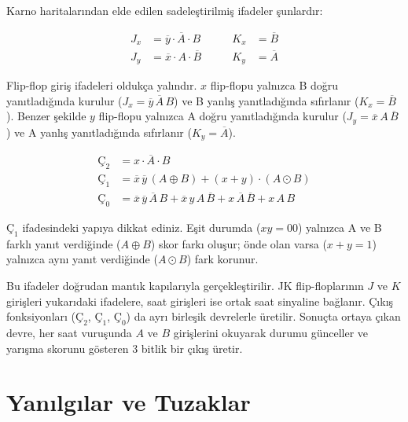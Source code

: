 \begin{ornek}[B.17]
Karno haritalarından elde edilen sadeleştirilmiş ifadeler şunlardır:

\[
\begin{aligned}
J_x &= \overline{y} \cdot \overline{A} \cdot B &\qquad K_x &= \overline{B} \\
J_y &= \overline{x} \cdot A \cdot \overline{B} &\qquad K_y &= \overline{A}
\end{aligned}
\]

Flip-flop giriş ifadeleri oldukça yalındır. $x$ flip-flopu yalnızca B doğru yanıtladığında kurulur ($J_x = \overline{y}\,\overline{A}\,B$) ve B yanlış yanıtladığında sıfırlanır ($K_x = \overline{B}$). Benzer şekilde $y$ flip-flopu yalnızca A doğru yanıtladığında kurulur ($J_y = \overline{x}\,A\,\overline{B}$) ve A yanlış yanıtladığında sıfırlanır ($K_y = \overline{A}$).

\[
\begin{aligned}
\text{Ç}_2 &= x \cdot \overline{A} \cdot B \\
\text{Ç}_1 &= \overline{x}\,\overline{y}\,(A \oplus B) + (x + y) \cdot (A \odot B) \\
\text{Ç}_0 &= \overline{x}\,\overline{y}\,\overline{A}\,B + \overline{x}\,y\,A\,\overline{B} + x\,\overline{A}\,\overline{B} + x\,A\,B
\end{aligned}
\]

$\text{Ç}_1$ ifadesindeki yapıya dikkat ediniz. Eşit durumda ($xy{=}00$) yalnızca A ve B farklı yanıt verdiğinde ($A \oplus B$) skor farkı oluşur; önde olan varsa ($x{+}y{=}1$) yalnızca aynı yanıt verdiğinde ($A \odot B$) fark korunur.

Bu ifadeler doğrudan mantık kapılarıyla gerçekleştirilir. JK flip-floplarının $J$ ve $K$ girişleri yukarıdaki ifadelere, saat girişleri ise ortak saat sinyaline bağlanır. Çıkış fonksiyonları ($\text{Ç}_2$, $\text{Ç}_1$, $\text{Ç}_0$) da ayrı birleşik devrelerle üretilir. Sonuçta ortaya çıkan devre, her saat vuruşunda $A$ ve $B$ girişlerini okuyarak durumu günceller ve yarışma skorunu gösteren 3 bitlik bir çıkış üretir.

\end{ornek}


\section{Yanılgılar ve Tuzaklar}
\label{sec:yanilgilar-tuzaklar-sayisal-tasarim}

